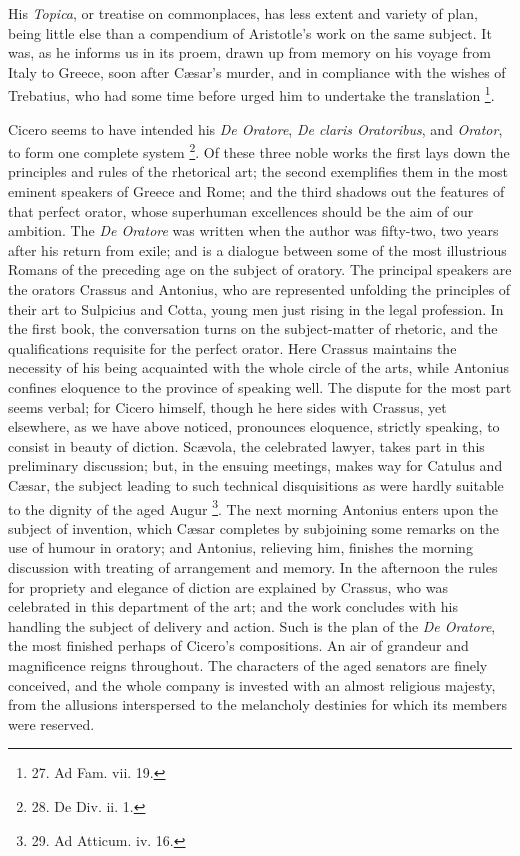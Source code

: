 His \emph{Topica}, or treatise
on commonplaces, has less extent and variety of plan, being little
else than a compendium of Aristotle's work on the same subject. It
was, as he informs us in its proem, drawn up from memory on his voyage
from Italy to Greece, soon after Cæsar's murder, and in compliance
with the wishes of Trebatius, who had some time before urged him to
undertake the translation \footnote{27. Ad Fam. vii. 19.}.

Cicero seems to have intended
his \emph{De Oratore}, \emph{De claris Oratoribus}, and \emph{Orator},
to form one complete system \footnote{28. De Div. ii. 1.}. Of these three noble works the
first lays down the principles and rules of the rhetorical art; the
second exemplifies them in the most eminent speakers of Greece and
Rome; and the third shadows out the features of that perfect orator,
whose superhuman excellences should be the aim of our ambition. The \emph{De
Oratore} was written when the author was fifty-two, two years after
his return from exile; and is a dialogue between some of the most
illustrious Romans of the preceding age on the subject of oratory. The
principal speakers are the orators Crassus and Antonius, who are
represented unfolding the principles of their art to Sulpicius and
Cotta, young men just rising in the legal profession. In the first
book, the conversation turns on the subject-matter of rhetoric, and
the qualifications requisite for the perfect orator. Here Crassus
maintains the necessity of his being acquainted with the whole circle
of the arts, while Antonius confines eloquence to the province of
speaking well. The dispute for the most part seems verbal; for
Cicero himself, though he here sides with Crassus, yet elsewhere, as
we have above noticed, pronounces eloquence, strictly speaking, to
consist in beauty of diction. Scævola, the celebrated lawyer, takes
part in this preliminary discussion; but, in the ensuing meetings,
makes way for Catulus and Cæsar, the subject leading to such
technical disquisitions as were hardly suitable to the dignity of the
aged Augur \footnote{29. Ad Atticum. iv. 16.}. The next morning Antonius enters upon the
subject of invention, which Cæsar completes by subjoining some
remarks on the use of humour in oratory; and Antonius, relieving him,
finishes the morning discussion with treating of arrangement and
memory. In the afternoon the rules for propriety and elegance of
diction are explained by Crassus, who was celebrated in this
department of the art; and the work concludes with his handling the
subject of delivery and action. Such is the plan of the \emph{De Oratore},
the most finished perhaps of Cicero's compositions. An air of
grandeur and magnificence reigns throughout. The characters of the
aged senators are finely conceived, and the whole company is invested
with an almost religious majesty, from the allusions interspersed to
the melancholy destinies for which its members were reserved.

